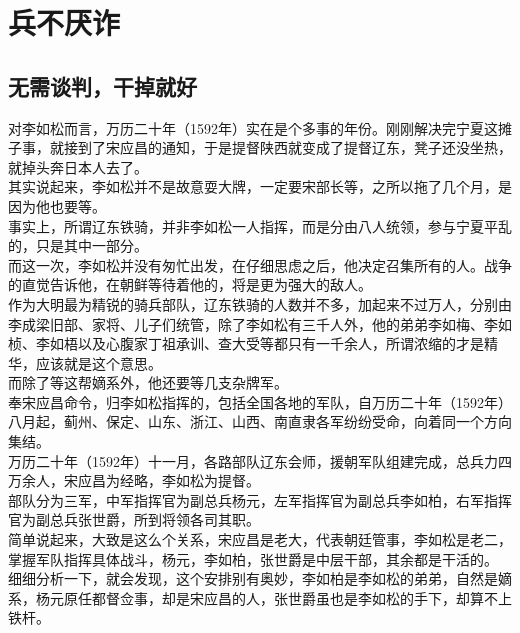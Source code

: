 \section{兵不厌诈}
\ifnum{}
	\begin{multicols}{\theparacolNo}
\fi
\subsection{无需谈判，干掉就好}
对李如松而言，万历二十年（1592年）实在是个多事的年份。刚刚解决完宁夏这摊子事，就接到了宋应昌的通知，于是提督陕西就变成了提督辽东，凳子还没坐热，就掉头奔日本人去了。\\

其实说起来，李如松并不是故意耍大牌，一定要宋部长等，之所以拖了几个月，是因为他也要等。\\

事实上，所谓辽东铁骑，并非李如松一人指挥，而是分由八人统领，参与宁夏平乱的，只是其中一部分。\\

而这一次，李如松并没有匆忙出发，在仔细思虑之后，他决定召集所有的人。战争的直觉告诉他，在朝鲜等待着他的，将是更为强大的敌人。\\

作为大明最为精锐的骑兵部队，辽东铁骑的人数并不多，加起来不过万人，分别由李成梁旧部、家将、儿子们统管，除了李如松有三千人外，他的弟弟李如梅、李如桢、李如梧以及心腹家丁祖承训、查大受等都只有一千余人，所谓浓缩的才是精华，应该就是这个意思。\\

而除了等这帮嫡系外，他还要等几支杂牌军。\\

奉宋应昌命令，归李如松指挥的，包括全国各地的军队，自万历二十年（1592年）八月起，蓟州、保定、山东、浙江、山西、南直隶各军纷纷受命，向着同一个方向集结。\\

万历二十年（1592年）十一月，各路部队辽东会师，援朝军队组建完成，总兵力四万余人，宋应昌为经略，李如松为提督。\\

部队分为三军，中军指挥官为副总兵杨元，左军指挥官为副总兵李如柏，右军指挥官为副总兵张世爵，所到将领各司其职。\\

简单说起来，大致是这么个关系，宋应昌是老大，代表朝廷管事，李如松是老二，掌握军队指挥具体战斗，杨元，李如柏，张世爵是中层干部，其余都是干活的。\\

细细分析一下，就会发现，这个安排别有奥妙，李如柏是李如松的弟弟，自然是嫡系，杨元原任都督佥事，却是宋应昌的人，张世爵虽也是李如松的手下，却算不上铁杆。\\


\end{multicols}
